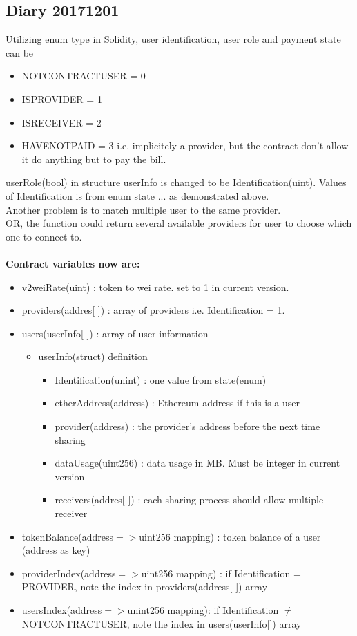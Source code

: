 \subsection{Diary 20171201}
Utilizing enum type in Solidity, user identification, user role and payment state 
can be
\begin{itemize}
    \item NOTCONTRACTUSER = 0
    \item ISPROVIDER = 1
    \item ISRECEIVER = 2
    \item HAVENOTPAID = 3 i.e. implicitely a provider, but the contract don't allow it do anything but to pay the bill.
\end{itemize}
userRole(bool) in structure userInfo is changed to be Identification(uint). 
Values of Identification is from enum state {...} as demonstrated above.\\
Another problem is to match multiple user to the same provider.\\
OR, the function could return several available providers for user to choose which one 
to connect to.\\\\
\textbf{Contract variables now are:}
\begin{itemize}
    \item v2weiRate(uint) : token to wei rate. set to 1 in current version.    
    \item providers(addres[ ]) : array of providers i.e. Identification = 1.
    \item users(userInfo[ ]) : array of user information
    \begin{itemize}
        \item userInfo(struct) definition
        \begin{itemize}
            \item Identification(unint) : one value from state(enum)
            \item etherAddress(address) : Ethereum address if this is a user
            \item provider(address) : the provider's address before the next time sharing
            \item dataUsage(uint256) : data usage in MB. Must be integer in current version
            \item receivers(addres[ ]) : each sharing process should allow multiple receiver
        \end{itemize}
    \end{itemize}
    \item tokenBalance(address$=>$uint256 mapping) : token balance of a user (address as key)
    \item providerIndex(address$=>$uint256 mapping) : if Identification = PROVIDER, note the index in providers(address[ ]) array
    \item usersIndex(address$=>$unint256 mapping): if Identification $\neq$ NOTCONTRACTUSER, note the index in users(userInfo[]) array
\end{itemize}
